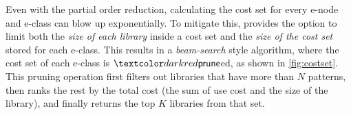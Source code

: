 
%
Even with the partial order reduction,
  calculating the cost set for every e-node and e-class
  can blow up exponentially.
%
To mitigate this,
  \tool provides the option to limit
  both the \emph{size of each library} inside a cost set
  and the \emph{size of the cost set} stored for each e-class.
%
This results in a \emph{beam-search} style algorithm,
where the cost set of each e-class is $\sfprune$ed, as shown in \autoref{fig:costset}.
%
This pruning operation first filters out libraries that have more than $N$ patterns,
then ranks the rest by the total cost (\ie the sum of use cost and the size of the library),
and finally returns the top $K$ libraries from that set.
  
%

